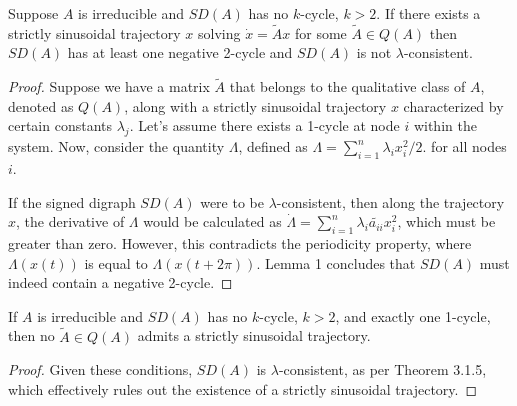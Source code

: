 \begin{thm}
	Suppose $A$ is irreducible and $SD(A)$ has no $k$-cycle, $k > 2$. If there exists a strictly sinusoidal trajectory $x$ solving $\dot{x} = \tilde{A}x$ for some $\tilde{A} \in Q(A)$ then $SD(A)$ has at least one negative 2-cycle and $SD(A)$ is not $\lambda$-consistent.
\end{thm}


\begin{proof}

	Suppose we have a matrix $\tilde{A}$ that belongs to the qualitative class of $A$, denoted as $Q(A)$, along with a strictly sinusoidal trajectory $x$ characterized by certain constants ${\lambda_j}$. Let's assume there exists a 1-cycle at node $i$ within the system. Now, consider the quantity $\Lambda$, defined as $\Lambda = \sum_{i=1}^n \lambda_i x_i^2/2$. for all nodes $i$.
	
	If the signed digraph $SD(A)$ were to be $\lambda$-consistent, then along the trajectory $x$, the derivative of $\Lambda$ would be calculated as $\dot{\Lambda} = \sum_{i=1}^n \lambda_i\tilde{a_{ii}} x_i^2$, which must be greater than zero. However, this contradicts the periodicity property, where $\Lambda(x(t))$ is equal to $\Lambda(x(t+2\pi))$. Lemma 1 concludes that $SD(A)$ must indeed contain a negative 2-cycle.
	
\end{proof}

\begin{cor}
	If $A$ is irreducible and $SD(A)$ has no $k$-cycle, $k > 2$, and exactly one 1-cycle, then no $\tilde{A} \in Q(A)$ admits a strictly sinusoidal trajectory.
\end{cor}

\begin{proof}
	Given these conditions, $SD(A)$ is $\lambda$-consistent, as per Theorem 3.1.5, which effectively rules out the existence of a strictly sinusoidal trajectory.
\end{proof}
